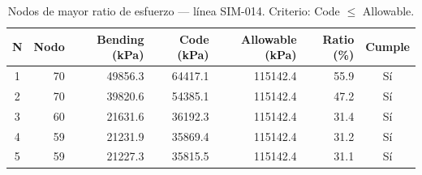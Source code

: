 \begin{table}[htbp]
  \centering
  \small
  \caption{Nodos de mayor ratio de esfuerzo — línea SIM-014. Criterio: Code $\leq$ Allowable.}
  \label{tab:top5-ratio}
  \begin{tabular}{crrrrrc}
    \toprule
    N & Nodo & Bending (\si{kPa}) & Code (\si{kPa}) & Allowable (\si{kPa}) & Ratio (\%) & Cumple \\
    \midrule
    1 & 70 & \num{49856.3} & \num{64417.1} & \num{115142.4} & 55.9 & Sí \\
    2 & 70 & \num{39820.6} & \num{54385.1} & \num{115142.4} & 47.2 & Sí \\
    3 & 60 & \num{21631.6} & \num{36192.3} & \num{115142.4} & 31.4 & Sí \\
    4 & 59 & \num{21231.9} & \num{35869.4} & \num{115142.4} & 31.2 & Sí \\
    5 & 59 & \num{21227.3} & \num{35815.5} & \num{115142.4} & 31.1 & Sí \\
    \bottomrule
  \end{tabular}
\end{table}
